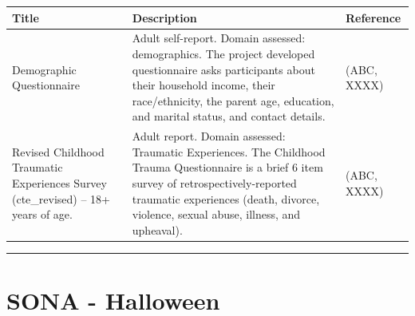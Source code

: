 \documentclass[]{book}
\begin{document}
\begin{longtable}[]{@{}lll@{}}
\toprule
\begin{minipage}[b]{0.32\columnwidth}\raggedright
Title\strut
\end{minipage} & \begin{minipage}[b]{0.32\columnwidth}\raggedright
Description\strut
\end{minipage} & \begin{minipage}[b]{0.27\columnwidth}\raggedright
Reference\strut
\end{minipage}\tabularnewline
\midrule
\endhead
\begin{minipage}[t]{0.32\columnwidth}\raggedright
Demographic Questionnaire\strut
\end{minipage} & \begin{minipage}[t]{0.32\columnwidth}\raggedright
Adult self-report. Domain assessed: demographics. The project developed questionnaire asks participants about their household income, their race/ethnicity, the parent age, education, and marital status, and contact details.\strut
\end{minipage} & \begin{minipage}[t]{0.27\columnwidth}\raggedright
(ABC, XXXX)\strut
\end{minipage}\tabularnewline
\begin{minipage}[t]{0.32\columnwidth}\raggedright
Revised Childhood Traumatic Experiences Survey (cte\_revised) -- 18+ years of age.\strut
\end{minipage} & \begin{minipage}[t]{0.32\columnwidth}\raggedright
Adult report. Domain assessed: Traumatic Experiences. The Childhood Trauma Questionnaire is a brief 6 item survey of retrospectively-reported traumatic experiences (death, divorce, violence, sexual abuse, illness, and upheaval).\strut
\end{minipage} & \begin{minipage}[t]{0.27\columnwidth}\raggedright
(ABC, XXXX)\strut
\end{minipage}\tabularnewline
\bottomrule
\end{longtable}

\begin{center}\rule{0.5\linewidth}{0.5pt}\end{center}

\hypertarget{sona---halloween}{%
\section{SONA - Halloween}\label{sona---halloween}}
\end{document}
